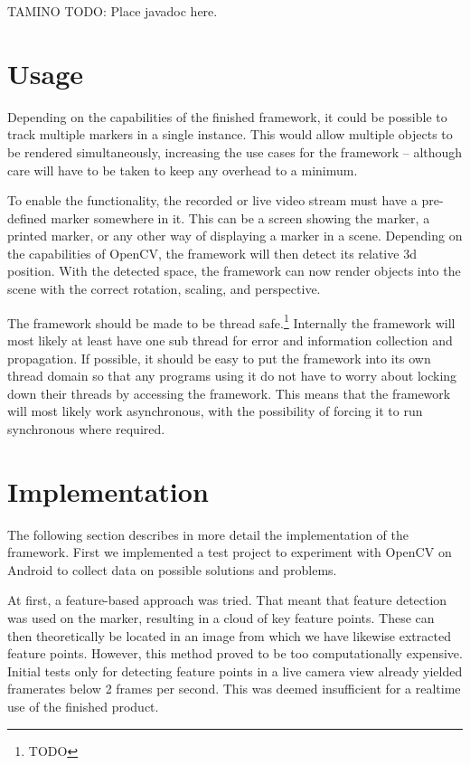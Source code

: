 TAMINO TODO: Place javadoc here.

\section{Usage}

Depending on the capabilities of the finished framework, it could be possible to track multiple markers in a single instance.
This would allow multiple objects to be rendered simultaneously, increasing the use cases for the framework – although care will have to be taken to keep any overhead to a minimum.

To enable the functionality, the recorded or live video stream must have a pre-defined marker somewhere in it.
This can be a screen showing the marker, a printed marker, or any other way of displaying a marker in a scene.
Depending on the capabilities of OpenCV, the framework will then detect its relative 3d position.
With the detected space, the framework can now render objects into the scene with the correct rotation, scaling, and perspective.

The framework should be made to be thread safe.\footnote{TODO}
Internally the framework will most likely at least have one sub thread for error and information collection and propagation.
If possible, it should be easy to put the framework into its own thread domain so that any programs using it do not have to worry about locking down their threads by accessing the framework.
This means that the framework will most likely work asynchronous, with the possibility of forcing it to run synchronous where required.

\section{Implementation}

The following section describes in more detail the implementation of the framework.
First we implemented a test project to experiment with OpenCV on Android to collect data on possible solutions and problems.

At first, a feature-based approach was tried.
That meant that feature detection was used on the marker, resulting in a cloud of key feature points.
These can then theoretically be located in an image from which we have likewise extracted feature points.
However, this method proved to be too computationally expensive.
Initial tests only for detecting feature points in a live camera view already yielded framerates below 2 frames per second.
This was deemed insufficient for a realtime use of the finished product.

